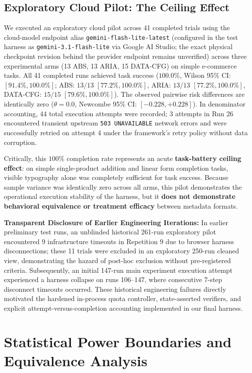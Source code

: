\documentclass[11pt,a4paper]{article}
\begin{document}
\subsection{Exploratory Cloud Pilot: The Ceiling Effect}
We executed an exploratory cloud pilot across 41 completed trials using the cloud-model endpoint alias \texttt{gemini-flash-lite-latest} (configured in the test harness as \texttt{gemini-3.1-flash-lite} via Google AI Studio; the exact physical checkpoint revision behind the provider endpoint remains unverified) across three experimental arms (13 ABS, 13 ARIA, 15 DATA-CFG) on simple e-commerce tasks. All 41 completed runs achieved task success ($100.0\%$, Wilson 95\% CI: $[91.4\%, 100.0\%]$; ABS: $13/13$ $[77.2\%, 100.0\%]$, ARIA: $13/13$ $[77.2\%, 100.0\%]$, DATA-CFG: $15/15$ $[79.6\%, 100.0\%]$). The observed pairwise risk differences are identically zero ($\hat{\theta} = 0.0$, Newcombe 95\% CI: $[-0.228, +0.228]$). In denominator accounting, 44 total execution attempts were recorded; 3 attempts in Run 26 encountered transient upstream \texttt{503 UNAVAILABLE} network errors and were successfully retried on attempt 4 under the framework's retry policy without data corruption.

Critically, this $100\%$ completion rate represents an acute \textbf{task-battery ceiling effect}: on simple single-product addition and linear form completion tasks, visible typography alone was completely sufficient for task success. Because sample variance was identically zero across all arms, this pilot demonstrates the operational execution stability of the harness, but it \textbf{does not demonstrate behavioral equivalence or treatment efficacy} between metadata formats.

\textbf{Transparent Disclosure of Earlier Engineering Iterations:} In earlier preliminary test runs, an unblinded historical 261-run exploratory pilot encountered 9 infrastructure timeouts in Repetition 9 due to browser harness disconnections; these 11 trials were excluded in an exploratory 250-run cleaned view, demonstrating the hazard of post-hoc exclusion without pre-registered criteria. Subsequently, an initial 147-run main experiment execution attempt experienced a harness collapse on runs 106--147, where consecutive 7-step disconnect timeouts occurred. These historical engineering failures directly motivated the hardened in-process quota controller, state-asserted verifiers, and explicit attempt-versus-completion accounting implemented in our final harness.

\section{Statistical Power Boundaries and Equivalence Analysis}
\label{sec:power}
\end{document}
